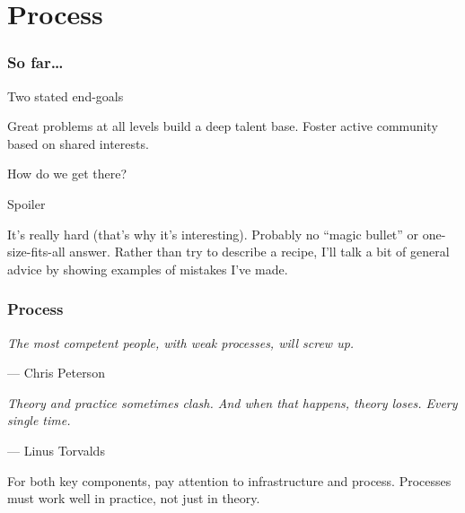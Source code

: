 \documentclass[11pt]{beamer}
\begin{document}
\section{Process}
\begin{frame}
  \frametitle{So far\dots}
  \begin{block}{Two stated end-goals}
    \begin{itemize}
      \ii Great problems at all levels build a deep talent base.
      \ii Foster active community based on shared interests.
    \end{itemize}
    How do we get there?
  \end{block}
  \pause
  \begin{alertblock}{Spoiler}
    \begin{itemize}
      \ii It's really hard (that's why it's interesting).
      \ii Probably no ``magic bullet'' or one-size-fits-all answer.
      \ii Rather than try to describe a recipe,
      I'll talk a bit of general advice by showing examples of mistakes I've made.
    \end{itemize}
  \end{alertblock}
\end{frame}
\begin{frame}
  \frametitle{Process}
  \begin{block}{}
    {\slshape
      The most competent people, with weak processes, will screw up.}

    \bigskip \hspace{2em} --- Chris Peterson
  \end{block}
  \begin{block}{}
    {\slshape
      Theory and practice sometimes clash.
      And when that happens, theory loses.
      Every single time.}

    \bigskip \hspace{2em} --- Linus Torvalds
  \end{block}
  For both key components, pay attention to infrastructure and process.
  Processes must work well in practice, not just in theory.
\end{frame}
\end{document}
